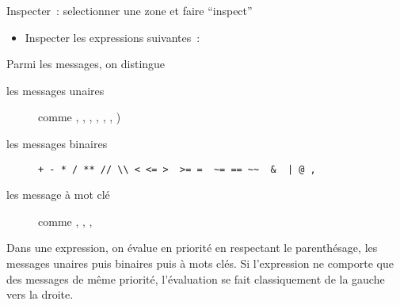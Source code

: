 Inspecter~: selectionner une zone et faire ``inspect''
\begin{itemize}
\item Inspecter les expressions suivantes~:
\end{itemize}

Parmi les messages, on distingue 

\begin{description}
\item [ les messages unaires ] comme , , , , , , )
\item [ les messages binaires ] 
\verb?+ - * / ** // \\ < <= >  >= =  ~= == ~~  &  | @ ,?
\item [ les message \`a mot cl\'e ] comme , , , 
\end{description}
Dans une expression, on \'evalue en priorit\'e en respectant le parenth\'esage, les messages unaires puis binaires puis \`a mots cl\'es. Si l'expression ne comporte que des messages de m\^eme priorit\'e, l'\'evaluation se fait classiquement de la gauche vers la droite.

